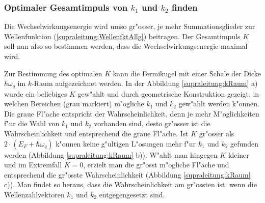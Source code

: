 \begin{refsection}
\subsubsection{Optimaler Gesamtimpuls von $k_1$ und $k_2$ finden}

Die Wechselwirkungsenergie wird umso gr"osser, je mehr Summationsglieder zur Wellenfunktion
(\ref{supraleitung:WellenfktAllg}) beitragen.
Der Gesamtimpuls $K$ soll nun also so bestimmen werden, dass die Wechselwirkungsenergie maximal wird.

Zur Bestimmung des optimalen $K$ kann die Fermikugel mit einer Schale der Dicke
$\hbar\omega_q$ im $k$-Raum aufgezeichnet werden.
In der Abbildung \ref{supraleitung:kRaum} a) wurde ein beliebiges $K$ gew"ahlt und durch
geometrische Konstruktion gezeigt, in welchen Bereichen (grau markiert) m"ogliche $k_1$ und $k_2$
gew"ahlt werden k"onnen.
Die graue Fl"ache entspricht der Wahrscheinlichkeit, denn je mehr M"oglichkeiten f"ur die Wahl
von $k_1$ und $k_2$ vorhanden sind, desto gr"osser ist die Wahrscheinlichkeit und entsprechend
die graue Fl"ache.
Ist $K$ gr"osser als $2\cdot(E_F+\hbar\omega_q)$ k"onnen keine g"ultigen L"osungen mehr
f"ur $k_1$ und $k_2$ gefunden werden (Abbildung \ref{supraleitung:kRaum} b)).
W"ahlt man hingegen $K$ kleiner und im Extremfall $K=0$, erzielt man die gr"osst m"ogliche
Fl"ache und entsprechend die gr"osste Wahrscheinlichkeit (Abbildung \ref{supraleitung:kRaum} c)).
Man findet so heraus, dass die Wahrscheinlichkeit am gr"ossten ist, wenn die
Wellenzahlvektoren $k_1$ und $k_2$ entgegengesetzt sind.


\end{refsection}
